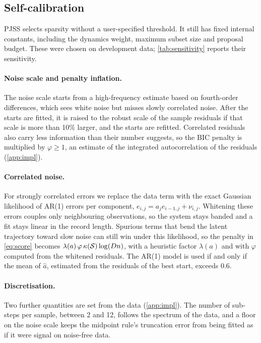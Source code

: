\subsection{Self-calibration}
\label{sec:calibration}
PJSS selects sparsity without a user-specified threshold. It still has fixed internal constants, including the dynamics weight, maximum subset size and proposal budget. These were chosen on development data; \cref{tab:sensitivity} reports their sensitivity.
\paragraph{Noise scale and penalty inflation.}
The noise scale starts from a high-frequency estimate based on fourth-order differences, which sees white noise but misses slowly correlated noise. After the starts are fitted, it is raised to the robust scale of the sample residuals if that scale is more than 10\% larger, and the starts are refitted. Correlated residuals also carry less information than their number suggests, so the BIC penalty is multiplied by $\varphi\ge1$, an estimate of the integrated autocorrelation of the residuals (\cref{app:impl}).

\paragraph{Correlated noise.}
For strongly correlated errors we replace the data term with the exact Gaussian likelihood of AR(1) errors per component, $e_{i,j}=a_j e_{i-1,j}+\nu_{i,j}$. Whitening these errors couples only neighbouring observations, so the system stays banded and a fit stays linear in the record length. Spurious terms that bend the latent trajectory toward slow noise can still win under this likelihood, so the penalty in \eqref{eq:score} becomes $\lambda(a)\,\varphi\,\kappa(\mathcal{S})\log(Dn)$, with a heuristic factor $\lambda(a)$ and with $\varphi$ computed from the whitened residuals. The AR(1) model is used if and only if the mean of $\hat a$, estimated from the residuals of the best start, exceeds $0.6$.

\paragraph{Discretisation.} Two further quantities are set from the data (\cref{app:impl}). The number of sub-steps per sample, between 2 and 12, follows the spectrum of the data, and a floor on the noise scale keeps the midpoint rule's truncation error from being fitted as if it were signal on noise-free data.

